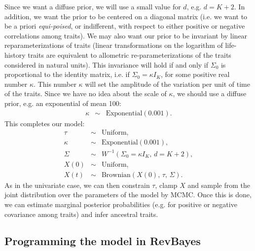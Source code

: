 \documentclass[usletter]{article}
\begin{document}
Since we want a diffuse prior, we will use a small value for $d$, e.g. $d=K+2$.
In addition, we want the prior to be centered on a diagonal matrix (i.e. we want to be a priori \emph{equi-poised}, or indifferent, with respect to either positive or negative correlations among traits). We may also want our prior to be invariant by linear reparameterizations of traits (linear transformations on the logarithm of life-history traits are equivalent to allometric re-parameterizations of the traits considered in natural units). This invariance will hold if and only if $\Sigma_0$ is proportional to the identity matrix, i.e. if $\Sigma_0 = \kappa I_K$, for some positive real number $\kappa$. This number $\kappa$ will set the amplitude of the variation per unit of time of the traits. Since we have no idea about the scale of $\kappa$, we should use a diffuse prior, e.g. an exponential of mean 100:
\begin{eqnarray*}
\kappa &\sim& \text{Exponential}(0.001).
\end{eqnarray*}
This completes our model:
\begin{eqnarray*}
\tau &\sim& \text{Uniform},
\\
\kappa &\sim& \text{Exponential}(0.001),
\\
\Sigma &\sim& W^{-1}(\Sigma_0 = \kappa I_K , \, d = K+2),
\\
X(0) &\sim& \text{Uniform},
\\
X(t) &\sim& \text{Brownian}(X(0), \, \tau, \, \Sigma).
\end{eqnarray*}
As in the univariate case, we can then constrain $\tau$, clamp $X$ and sample from the joint distribution over the parameters of the model by MCMC.
Once this is done, we can estimate marginal posterior probabilities (e.g. for positive or negative covariance among traits) and infer ancestral traits.

\subsection*{Programming the model in RevBayes}
\end{document}
